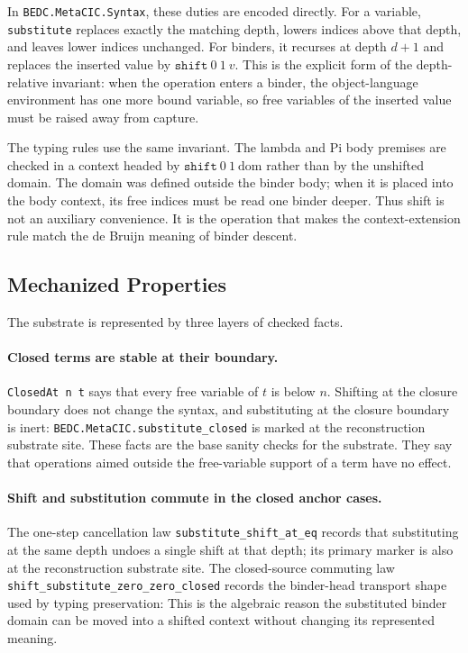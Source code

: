 In \texttt{BEDC.MetaCIC.Syntax}, these duties are encoded directly. For a
variable, \texttt{substitute} replaces exactly the matching depth, lowers
indices above that depth, and leaves lower indices unchanged. For binders, it
recurses at depth $d+1$ and replaces the inserted value by
$\texttt{shift}\ 0\ 1\ v$. This is the explicit form of the depth-relative
invariant: when the operation enters a binder, the object-language environment
has one more bound variable, so free variables of the inserted value must be
raised away from capture.

The typing rules use the same invariant. The lambda and Pi body premises are
checked in a context headed by $\texttt{shift}\ 0\ 1\ \mathrm{dom}$ rather than
by the unshifted domain. The domain was defined outside the binder body; when it
is placed into the body context, its free indices must be read one binder
deeper. Thus shift is not an auxiliary convenience. It is the operation that
makes the context-extension rule match the de Bruijn meaning of binder descent.

\subsection{Mechanized Properties}
\label{subsec:substrate-mechanized-properties}

The substrate is represented by three layers of checked facts.

\paragraph{Closed terms are stable at their boundary.}
\texttt{ClosedAt n t} says that every free variable of $t$ is below $n$.
Shifting at the closure boundary does not change the syntax, and substituting
at the closure boundary is inert:
\texttt{BEDC.MetaCIC.substitute\_closed} is marked at the reconstruction
substrate site.
These facts are the base sanity checks for the substrate. They say that
operations aimed outside the free-variable support of a term have no effect.

\paragraph{Shift and substitution commute in the closed anchor cases.}
The one-step cancellation law
\texttt{substitute\_shift\_at\_eq} records that substituting at the same depth
undoes a single shift at that depth; its primary marker is also at the
reconstruction substrate site.
The closed-source commuting law
\texttt{shift\_substitute\_zero\_zero\_closed} records the binder-head
transport shape used by typing preservation:
This is the algebraic reason the substituted binder domain can be moved into a
shifted context without changing its represented meaning.

